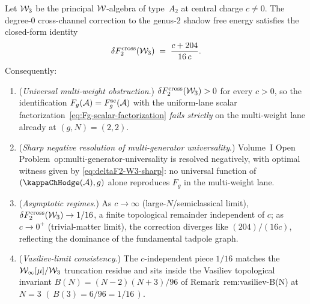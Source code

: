 \begin{theorem}
\label{thm:deltaF2-W3-sharp}
Let $\mathcal{W}_3$ be the principal $\mathcal{W}$-algebra of type~$A_2$ at
central charge $c \neq 0$. The degree-$0$ cross-channel
correction to the genus-$2$ shadow free energy satisfies the
closed-form identity
\begin{equation}\label{eq:deltaF2-W3-sharp}
\delta F_2^{\mathrm{cross}}(\mathcal{W}_3)
\;=\; \frac{c + 204}{16\,c}.
\end{equation}
Consequently:
\begin{enumerate}[label=\textup{(\roman*)}]
\item (\emph{Universal multi-weight obstruction}.)
$\delta F_2^{\mathrm{cross}}(\mathcal{W}_3) > 0$ for every
$c > 0$, so the identification
$F_g(\mathcal{A})=F_g^{\mathrm{sc}}(\mathcal{A})$ with the uniform-lane scalar
factorization~\eqref{eq:Fg-scalar-factorization}
\emph{fails strictly} on the multi-weight lane already at
$(g,N) = (2,2)$.
\item (\emph{Sharp negative resolution of
multi-generator universality}.) Volume~I Open
Problem~op:multi-generator-universality is resolved
negatively, with optimal witness given by
\eqref{eq:deltaF2-W3-sharp}: no universal function of
$(\kappaChHodge(\cA),g)$ alone reproduces $F_g$ in the multi-weight
lane.
\item (\emph{Asymptotic regimes}.) As $c \to \infty$
(large-$N$/semiclassical limit), $\delta
F_2^{\mathrm{cross}}(\mathcal{W}_3) \to 1/16$, a finite topological
remainder independent of $c$; as $c \to 0^+$
(trivial-matter limit), the correction diverges like
$(204)/(16c)$, reflecting the dominance of the fundamental
tadpole graph.
\item (\emph{Vasiliev-limit consistency}.) The
$c$-independent piece $1/16$ matches the
$\mathcal{W}_\infty[\mu]/\mathcal{W}_3$ truncation residue and sits inside
the Vasiliev topological invariant
$B(N) = (N{-}2)(N{+}3)/96$ of
Remark~\textup{rem:vasiliev-B(N)} at $N=3$
$(\,B(3) = 6/96 = 1/16\,)$.
\end{enumerate}
\end{theorem}

